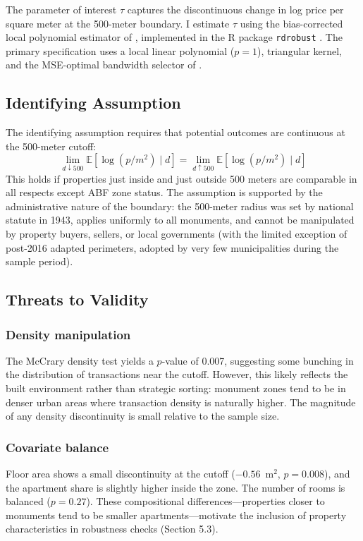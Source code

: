 \documentclass[12pt]{article}
\newcommand{\E}{\mathbb{E}}
\begin{document}
The parameter of interest $\tau$ captures the discontinuous change in log price per square meter at the 500-meter boundary. I estimate $\tau$ using the bias-corrected local polynomial estimator of \citet{CattaneoEtAl2014}, implemented in the R package \texttt{rdrobust} \citep{CattaneoEtAl2019}. The primary specification uses a local linear polynomial ($p = 1$), triangular kernel, and the MSE-optimal bandwidth selector of \citet{CattaneoEtAl2020}.

\subsection{Identifying Assumption}

The identifying assumption requires that potential outcomes are continuous at the 500-meter cutoff:
\begin{equation}
\lim_{d \downarrow 500} \E[\log(p/m^2) \mid d] = \lim_{d \uparrow 500} \E[\log(p/m^2) \mid d]
\end{equation}
This holds if properties just inside and just outside 500 meters are comparable in all respects except ABF zone status. The assumption is supported by the administrative nature of the boundary: the 500-meter radius was set by national statute in 1943, applies uniformly to all monuments, and cannot be manipulated by property buyers, sellers, or local governments (with the limited exception of post-2016 adapted perimeters, adopted by very few municipalities during the sample period).

\subsection{Threats to Validity}

\subsubsection*{Density manipulation} The McCrary density test \citep{McCrary2008} yields a $p$-value of 0.007, suggesting some bunching in the distribution of transactions near the cutoff. However, this likely reflects the built environment rather than strategic sorting: monument zones tend to be in denser urban areas where transaction density is naturally higher. The magnitude of any density discontinuity is small relative to the sample size.

\subsubsection*{Covariate balance} Floor area shows a small discontinuity at the cutoff ($-0.56$~m$^2$, $p = 0.008$), and the apartment share is slightly higher inside the zone. The number of rooms is balanced ($p = 0.27$). These compositional differences---properties closer to monuments tend to be smaller apartments---motivate the inclusion of property characteristics in robustness checks (Section 5.3).
\end{document}
